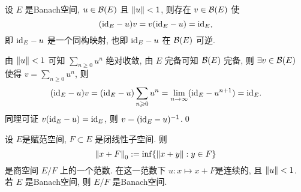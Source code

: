 	\begin{Theorem}
		 设 $ E $ 是Banach空间,  $ u\in\mathcal{B}(E) $ 且 $ \left\| u \right\|<1 $, 则存在 $ v\in\mathcal{B}(E) $ 使
		 \[
			 (\mathrm{id}_{E}-u)v=v(\mathrm{id}_{E}-u)=\mathrm{id}_{E},
		 \]
		 即 $ \mathrm{id}_{E}-u $ 是一个同构映射, 也即 $ \mathrm{id}_{E}-u $ 在 $ \mathcal{B}(E) $ 可逆.
	\end{Theorem}
	\begin{Proof}
		由 $ \left\| u \right\|<1 $ 可知 $ \sum\limits_{n\geqslant0}u^n $ 绝对收敛, 由 $ E $ 完备可知 $ \mathcal{B}
		(E) $ 完备, 则 $ \exists v\in\mathcal{B}(E) $ 使得 $ v=\sum\limits_{n\geqslant 0}u^n $, 则
		\[
			(\mathrm{id}_E-u)v=(\mathrm{id}_E-u)\sum_{n\geqslant 0}u^n=\lim_{n\to\infty}(\mathrm{id}_E-u^{n+1})=\mathrm{id}_E.
		\]
		同理可证 $ v(\mathrm{id}_E-u)=\mathrm{id}_E $, 则 $ v=(\mathrm{id}_E-u)^{-1} $.\qed
	\end{Proof}
	
	\begin{Theorem}
		设 $ E $是赋范空间, $ F\subset E $ 是闭线性子空间. 则
		\[
			\left\| x+F \right\|_0:=\inf\{ \left\| x+y \right\| : y\in F \}
		\]
		是商空间 $ E/F $ 上的一个范数. 在这一范数下 $ u : x\mapsto x+F $是连续的, 且 $ \left\| u \right\|<1 $. 若 $ E $ 是Banach空间, 则 $ E/F $ 是Banach空间.
	\end{Theorem}
